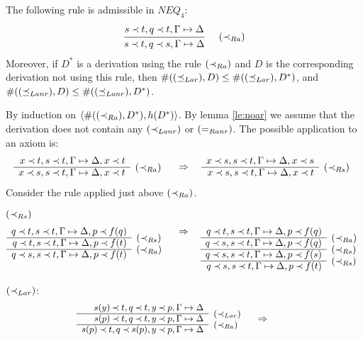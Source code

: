 %
\begin{LEMMA}\label{le:inclaad} The following rule is admissible in $NEQ_4$:
\[\mprule{s\Incl t, q\Incl t,\GSD}{s\Incl t, q\Incl s,\GSD} %
\ \ \ \ \iRa
\]
Moreover, if $D^*$ is a derivation using the rule $(\mathbin{\prec}_{Ra})$ and $D$ is the corresponding
derivation not using this rule, then $\#((\preceq_{Lar}),D)\leq\#((\preceq_{Lar}),D^*)$, and
$\#((\preceq_{Lanr}),D)\leq\#((\preceq_{Lanr}),D^*)$. 
\end{LEMMA}
\begin{PROOF}
By induction on $\langle \#((\mathbin{\prec}_{Ra}),D^*),h(D^*)\rangle$. 
By lemma  %
\ref{le:noar} %
we assume that the derivation does not 
contain any %
$(\mathbin{\prec}_{Lanr})$ or $(=_{Ranr})$. %
The possible application to an axiom is: %
\[
\begin{array}{rl}
x\Incl t, s\Incl t,\GSD,x\Incl t &  \\ \cline{1-1}
x\Incl s, s\Incl t,\GSD,x\Incl t & \rabove{\iRa}
\end{array}
\conv
\begin{array}{rl}
x\Incl s, s\Incl t,\GSD,x\Incl s \\ \cline{1-1}
x\Incl s,s\Incl t, \GSD,x\Incl t & \rabove{\iRs}
\end{array}
\]
Consider the rule applied just above $(\mathbin{\prec}_{Ra})$.
\begin{LS}
\item $(\mathbin{\prec}_{Rs})$
\[ \prar{
q\Incl t, s\Incl t,\GSD,p\Incl f(q) \\ \cline{1-1}
q\Incl t, s\Incl t,\GSD,p\Incl f(t) & \rabove{\iRs} \\ \cline{1-1}
q\Incl s, s\Incl t,\GSD,p\Incl f(t) & \rabove{\iRa}
}
\conv
\prar{
q\Incl t, s\Incl t,\GSD,p\Incl f(q) \\ \cline{1-1}
q\Incl s, s\Incl t,\GSD,p\Incl f(q) & \rabove{\iRa} \\ \cline{1-1}
q\Incl s, s\Incl t,\GSD,p\Incl f(s) & \rabove{\iRs} \\ \cline{1-1}
q\Incl s, s\Incl t,\GSD,p\Incl f(t) & \rabove{\iRs}
}
\]
\item $(\mathbin{\prec}_{Lar})$:
\[ \sma{ \begin{array}{rl}
 s(y) \Incl t, q\Incl t, y\Incl p, \GSD \\ \cline{1-1}
 s(p) \Incl t, q\Incl t, y\Incl p, \GSD & \rabove{\iLar} \\
 \cline{1-1}
 s(p) \Incl t, q\Incl s(p), y\Incl p, \GSD & \rabove{\iRa}
 \end{array} \conv
}\]
\end{LS}
\end{PROOF}
